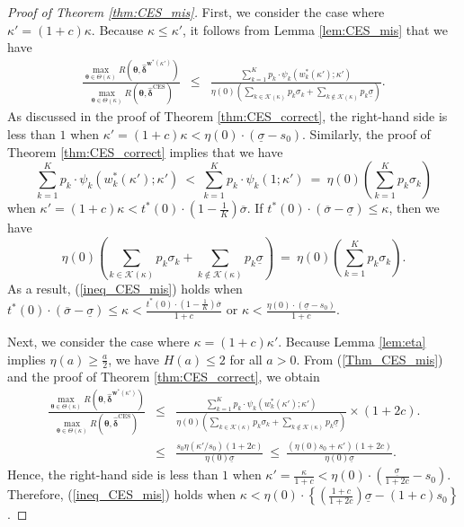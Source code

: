 \documentclass[12pt,a4paper]{article}
\begin{document}
\begin{proof}[Proof of Theorem \ref{thm:CES_mis}]
First, we consider the case where $\kappa' =(1+c)\kappa$. Because $\kappa \leq \kappa'$, it follows from Lemma \ref{lem:CES_mis} that we have
\begin{eqnarray}
\frac{\max_{\bm{\theta} \in \Theta(\kappa)} R(\bm{\theta},\hat{\bm{\delta}}^{\bm{w}^{\ast}(\kappa')})}{\max_{\bm{\theta} \in \Theta(\kappa)} R(\bm{\theta},\hat{\bm{\delta}}^{\mathrm{CES}})} & \leq & \frac{\sum_{k=1}^K p_k \cdot \psi_k\left( w_k^{\ast}(\kappa') ;\kappa' \right)}{\eta(0) \left( \sum_{k \in \mathcal{K}(\kappa)} p_k \sigma_k + \sum_{k \not\in \mathcal{K}(\kappa)} p_k \underline{\sigma} \right)}. \nonumber
\end{eqnarray}
As discussed in the proof of Theorem \ref{thm:CES_correct}, the right-hand side is less than $1$ when $\kappa' = (1+c)\kappa < \eta(0) \cdot (\underline{\sigma} - s_0)$. Similarly, the proof of Theorem \ref{thm:CES_correct} implies that we have
\[
\sum_{k=1}^K p_k \cdot \psi_k\left( w_k^{\ast}(\kappa') ;\kappa' \right) \ < \ \sum_{k=1}^K p_k \cdot \psi_k\left( 1 ;\kappa' \right) \ = \ \eta(0) \left( \sum_{k=1}^K p_k \sigma_k \right)
\]
when $\kappa' = (1+c) \kappa < t^{\ast}(0) \cdot \left( 1 - \frac{1}{K} \right) \overline{\sigma}$. If $t^{\ast}(0) \cdot (\overline{\sigma} - \underline{\sigma}) \leq \kappa$, then we have
\[
\eta(0) \left( \sum_{k \in \mathcal{K}(\kappa)} p_k \sigma_k + \sum_{k \not\in \mathcal{K}(\kappa)} p_k \underline{\sigma} \right) \ = \ \eta(0) \left( \sum_{k=1}^K p_k \sigma_k \right).
\]
As a result, (\ref{ineq_CES_mis}) holds when $t^{\ast}(0) \cdot (\overline{\sigma} - \underline{\sigma}) \leq \kappa < \frac{t^{\ast}(0) \cdot \left(1- \frac{1}{K}\right) \overline{\sigma}}{1+c}$ or $\kappa <  \frac{\eta(0) \cdot (\underline{\sigma} - s_0)}{1+c}$. 

Next, we consider the case where $\kappa =(1+c)\kappa'$. Because Lemma \ref{lem:eta} implies $\eta(a) \geq \frac{a}{2}$, we have $H(a) \leq 2$ for all $a>0$. From (\ref{Thm_CES_mis}) and the proof of Theorem \ref{thm:CES_correct}, we obtain
\begin{eqnarray}
\frac{\max_{\bm{\theta} \in \Theta(\kappa)} R(\bm{\theta},\hat{\bm{\delta}}^{\bm{w}^{\ast}(\kappa')})}{\max_{\bm{\theta} \in \Theta(\kappa)} R(\bm{\theta},\hat{\bm{\delta}}^{\mathrm{CES}})} & \leq & \frac{\sum_{k=1}^K p_k \cdot \psi_k\left( w_k^{\ast}(\kappa') ;\kappa' \right)}{\eta(0) \left( \sum_{k \in \mathcal{K}(\kappa)} p_k \sigma_k + \sum_{k \not\in \mathcal{K}(\kappa)} p_k \underline{\sigma} \right)} \times (1+2c). \nonumber \\
& \leq & \frac{s_0 \eta( \kappa' / s_0 ) (1+2c)}{\eta(0) \underline{\sigma}} \ \leq \ \frac{(\eta(0)s_0 + \kappa')(1+2c)}{\eta(0) \underline{\sigma}}.
\end{eqnarray}
Hence, the right-hand side is less than $1$ when $\kappa' = \frac{\kappa}{1+c} < \eta(0) \cdot \left( \frac{\underline{\sigma}}{1+2c} - s_0 \right)$. Therefore, (\ref{ineq_CES_mis}) holds when $\kappa < \eta(0) \cdot \left\{ \left( \frac{1+c}{1+2c}\right)  \underline{\sigma} - (1+c)s_0 \right\}$.
\end{proof}\vspace{0.1in}
\end{document}
